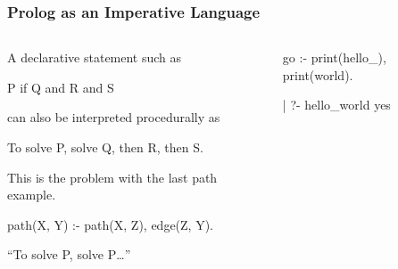 \documentclass{plt}
\begin{document}
\begin{frame}[fragile=singleslide]
  \frametitle{Prolog as an Imperative Language}

  \begin{columns}
    \begin{column}{0.6\textwidth}

\parskip=1pc

A declarative statement such as

\shadowstart
P if Q and R and S
\shadowend

can also be interpreted procedurally as

\shadowstart
To solve P, solve Q, then R, then S.
\shadowend

This is the problem with the last path example.

\begin{prolog}
path(X, Y) :-
   path(X, Z), edge(Z, Y).
\end{prolog}

``To solve P, solve P\ldots''
    \end{column}
    \begin{column}{0.4\textwidth}

\begin{prolog}
go :- print(hello_),
      print(world).
\end{prolog}

\begin{interactive}
| ?- 
hello_world
yes
\end{interactive}
    \end{column}
  \end{columns}

\end{frame}
\end{document}
